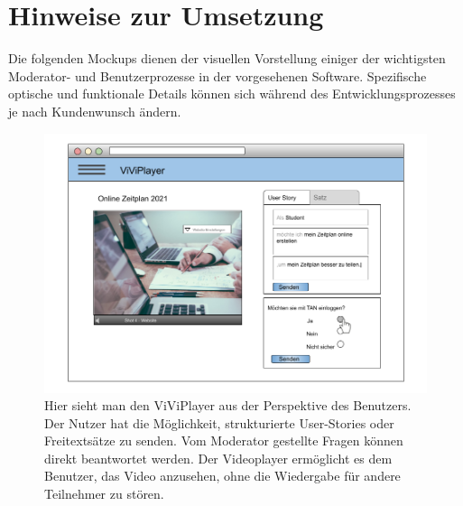 \section{Hinweise zur Umsetzung}
Die folgenden Mockups dienen der visuellen Vorstellung einiger der wichtigsten Moderator- und Benutzerprozesse in der vorgesehenen Software. Spezifische optische und funktionale Details können sich während des Entwicklungsprozesses je nach Kundenwunsch ändern.
\linebreak
\linebreak

\begin{figure}[h]
  \includegraphics[width=\linewidth]{5dot1.png}
  \caption{Hier sieht man den ViViPlayer aus der Perspektive des Benutzers. Der Nutzer hat die Möglichkeit, strukturierte User-Stories oder Freitextsätze zu senden. Vom Moderator gestellte Fragen können direkt beantwortet werden. Der Videoplayer ermöglicht es dem Benutzer, das Video anzusehen, ohne die Wiedergabe für andere Teilnehmer zu stören.}
  \label{fig:5dot1}
\end{figure}

